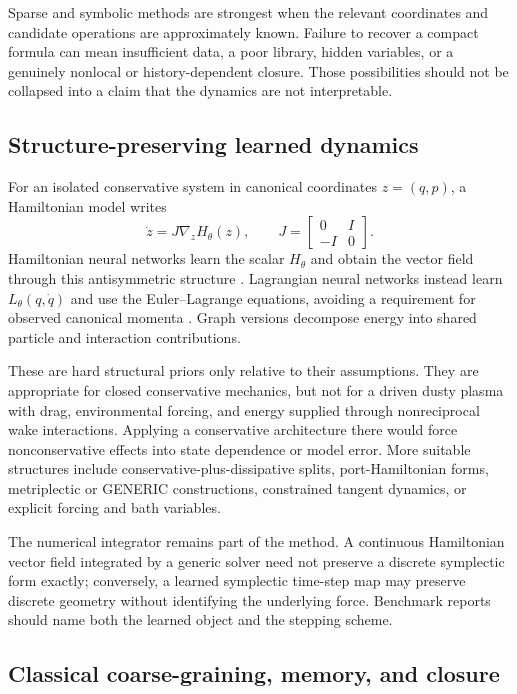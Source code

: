 Sparse and symbolic methods are strongest when the relevant coordinates and candidate operations are approximately known. Failure to recover a compact formula can mean insufficient data, a poor library, hidden variables, or a genuinely nonlocal or history-dependent closure. Those possibilities should not be collapsed into a claim that the dynamics are not interpretable.

\subsection{Structure-preserving learned dynamics}

For an isolated conservative system in canonical coordinates \(z=(q,p)\), a Hamiltonian model writes
\begin{equation}
\dot z=J\nabla_z H_\theta(z),
\qquad
J=
\begin{bmatrix}
0&I\\-I&0
\end{bmatrix}.
\end{equation}
Hamiltonian neural networks learn the scalar \(H_\theta\) and obtain the vector field through this antisymmetric structure \citep{greydanus2019hnn}. Lagrangian neural networks instead learn \(L_\theta(q,\dot q)\) and use the Euler--Lagrange equations, avoiding a requirement for observed canonical momenta \citep{cranmer2020lnn}. Graph versions decompose energy into shared particle and interaction contributions.

These are hard structural priors only relative to their assumptions. They are appropriate for closed conservative mechanics, but not for a driven dusty plasma with drag, environmental forcing, and energy supplied through nonreciprocal wake interactions. Applying a conservative architecture there would force nonconservative effects into state dependence or model error. More suitable structures include conservative-plus-dissipative splits, port-Hamiltonian forms, metriplectic or GENERIC constructions, constrained tangent dynamics, or explicit forcing and bath variables.

The numerical integrator remains part of the method. A continuous Hamiltonian vector field integrated by a generic solver need not preserve a discrete symplectic form exactly; conversely, a learned symplectic time-step map may preserve discrete geometry without identifying the underlying force. Benchmark reports should name both the learned object and the stepping scheme.

\subsection{Classical coarse-graining, memory, and closure}


